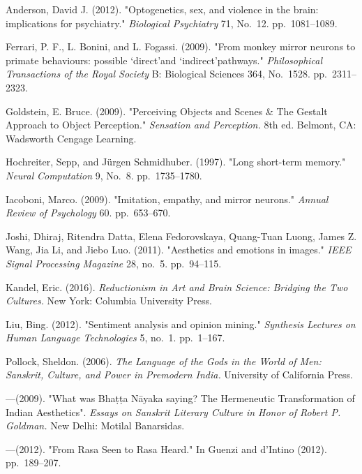 \begin{thebibliography}{99}
\itemsep=2pt
Anderson, David J. (2012). "Optogenetics, sex, and violence in the brain: implications for psychiatry." \textsl{Biological Psychiatry} 71, No.~12. pp.~1081--1089.

Ferrari, P. F., L. Bonini, and L. Fogassi. (2009). "From monkey mirror neurons to primate behaviours: possible ‘direct’and ‘indirect’pathways." \textsl{Philosophical Transactions of the Royal Society} B: Biological Sciences 364, No.~1528. pp.~2311--2323.

Goldstein, E. Bruce. (2009). "Perceiving Objects and Scenes \& The Gestalt Approach to Object Perception." \textsl{Sensation and Perception.} 8th ed. Belmont, CA: Wadsworth Cengage Learning.

Hochreiter, Sepp, and Jürgen Schmidhuber. (1997). "Long short-term memory." \textsl{Neural} \textsl{Computation} 9, No.~8. pp.~1735--1780.

Iacoboni, Marco. (2009). "Imitation, empathy, and mirror neurons." \textsl{Annual Review of Psychology} 60. pp.~653--670.

Joshi, Dhiraj, Ritendra Datta, Elena Fedorovskaya, Quang-Tuan Luong, James Z. Wang, Jia Li, and Jiebo Luo. (2011). "Aesthetics and emotions in images." \textsl{IEEE Signal Processing Magazine} 28, no.~5. pp.~94--115.

Kandel, Eric. (2016). \textsl{Reductionism in Art and Brain Science: Bridging the Two Cultures.} New York: Columbia University Press.

Liu, Bing. (2012). "Sentiment analysis and opinion mining." \textsl{Synthesis Lectures on Human Language Technologies} 5, no.~1. pp.~1--167.

Pollock, Sheldon. (2006). \textsl{The Language of the Gods in the World of Men: Sanskrit, Culture, and Power in Premodern India.} University of California Press.

---\kern3pt(2009). "What was Bhaṭṭa Nāyaka saying? The Hermeneutic Transformation of Indian Aesthetics". \textsl{Essays on Sanskrit Literary Culture in Honor of Robert P. Goldman.} New Delhi: Motilal Banarsidas.

---\kern3pt(2012). "From Rasa Seen to Rasa Heard." In Guenzi and d’Intino (2012). pp.~189--207.


\end{thebibliography}

